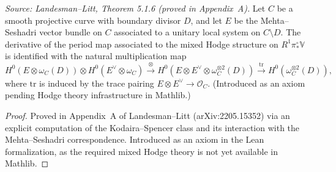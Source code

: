 
\begin{theorem}
  \label{thm:period-map}
  \textit{Source: Landesman--Litt, Theorem 5.1.6 (proved in Appendix~A).}
  Let $C$ be a smooth projective curve with boundary divisor $D$, and let
  $E$ be the Mehta--Seshadri vector bundle on $C$ associated to a unitary
  local system on $C \setminus D$.
  The derivative of the period map associated to the mixed Hodge structure on
  $R^1\pi^\circ_* \mathbb{V}$ is identified with the natural multiplication map
  \[
    H^0(E \otimes \omega_C(D)) \otimes H^0(E^\vee \otimes \omega_C)
    \xrightarrow{\otimes}
    H^0(E \otimes E^\vee \otimes \omega_C^{\otimes 2}(D))
    \xrightarrow{\mathrm{tr}}
    H^0(\omega_C^{\otimes 2}(D)),
  \]
  where $\mathrm{tr}$ is induced by the trace pairing
  $E \otimes E^\vee \to \mathcal{O}_C$.
  (Introduced as an axiom pending Hodge theory infrastructure in Mathlib.)
\end{theorem}

\begin{proof}
  Proved in Appendix~A of Landesman--Litt (arXiv:2205.15352) via an explicit
  computation of the Kodaira--Spencer class and its interaction with the
  Mehta--Seshadri correspondence.  Introduced as an axiom in the Lean
  formalization, as the required mixed Hodge theory is not yet available in
  Mathlib.
\end{proof}

